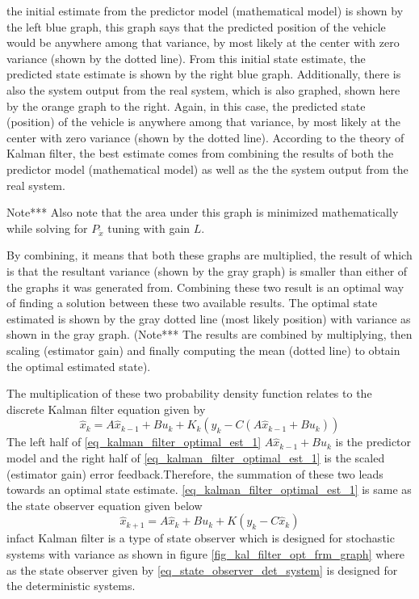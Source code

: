the initial estimate from the predictor model (mathematical model) is shown by the left blue graph, this graph says that the predicted position of the vehicle would be anywhere among that variance, by most likely at the center with zero variance (shown by the dotted line). From this initial state estimate, the predicted state estimate is shown by the right blue graph. Additionally, there is also the system output from the real system, which is also graphed, shown here by the orange graph to the right. Again, in this case, the predicted state (position) of the vehicle is anywhere among that variance, by most likely at the center with zero variance (shown by the dotted line). According to the theory of Kalman filter, the best estimate comes from combining the results of both the predictor model (mathematical model) as well as the the system output from the real system. 

Note*** Also note that the area under this graph is minimized mathematically while solving for $P_{\tilde{x}}$ tuning with gain $L$.

By combining, it means that both these graphs are multiplied, the result of which is that the resultant variance (shown by the gray graph) is smaller than either of the graphs it was generated from. Combining these two result is an optimal way of finding a solution between these two available results. The optimal state estimated is shown by the gray dotted line (most likely position) with variance as shown in the gray graph. (Note*** The results are combined by multiplying, then scaling (estimator gain) and finally computing the mean (dotted line) to obtain the optimal estimated state).

The multiplication of these two probability density function relates to the discrete Kalman filter equation given by
\begin{equation} \label{eq_kalman_filter_optimal_est_1}
	\hat{x}_{k} = A \hat{x}_{k-1} + B u_{k} + K_{k}(y_{k} - C(A \hat{x}_{k-1} + B u_{k}))
\end{equation}
The left half of \eqref{eq_kalman_filter_optimal_est_1} $A \hat{x}_{k-1} + B u_{k}$ is the predictor model and the right half of \eqref{eq_kalman_filter_optimal_est_1} is the scaled (estimator gain) error feedback.Therefore, the summation of these two leads towards an optimal state estimate. \eqref{eq_kalman_filter_optimal_est_1} is same as the state observer equation given below
\begin{equation}\label{eq_state_observer_det_system}
	\hat{x}_{k+1} = A \hat{x}_{k} + B u_{k} + K(y_{k} - C\hat{x}_{k})
\end{equation}
infact Kalman filter is a type of state observer which is designed for stochastic systems with variance as shown in figure \ref{fig_kal_filter_opt_frm_graph} where as the state observer given by \eqref{eq_state_observer_det_system} is designed for the deterministic systems. 


